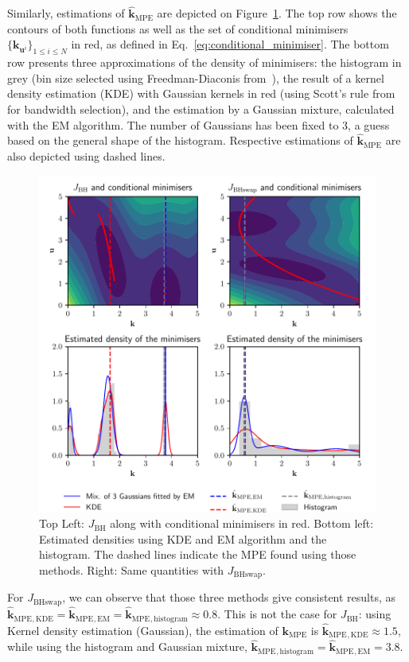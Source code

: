 \documentclass[preprint, 1p]{elsarticle}
\newcommand{\kmpe}{{\mathbf{k}}_{\mathrm{MPE}}}
\newcommand{\hatkmpe}{\hat{\mathbf{k}}_{\mathrm{MPE}}}
\newcommand{\JBH}{J_{\mathrm{BH}}}
\newcommand{\JBHS}{J_{\mathrm{BHswap}}}
\newlength{\singlecolumnsize}
\begin{document}
Similarly, estimations of $\hatkmpe$ are depicted on Figure~\ref{fig:contours}. The top row shows the contours of both functions as well as the set of conditional minimisers $\{\mathbf{k}_{\mathbf{u}^i}\}_{1\leq i \leq N}$ in red, as defined in Eq.~\eqref{eq:conditional_minimiser}.
The bottom row presents three approximations of the density of minimisers: the histogram in grey (bin size selected using Freedman-Diaconis from~\cite{freedman_histogram_1981}), the result of a kernel density estimation (KDE) with Gaussian kernels in red (using Scott's rule from~\cite{scott_optimal_1979} for bandwidth selection), and the estimation by a Gaussian mixture, calculated with the EM algorithm. The number of Gaussians has been fixed to 3, a guess based on the general shape of the histogram. Respective estimations of $\hatkmpe$ are also depicted using dashed lines. 
\begin{figure}[!h]
  \centering
  \includegraphics[width=\singlecolumnsize]{Figures/FIG02.pdf}
  \caption{Top Left:  $\JBH$ along with conditional minimisers in red. Bottom left: Estimated densities using KDE and EM algorithm and the histogram. The dashed lines indicate the MPE found using those methods. Right: Same quantities with $\JBHS$.}
\label{fig:contours}
\end{figure}

For $\JBHS$, we can observe that those three methods give consistent results, as $\hatkmpe {}_{,\mathrm{KDE}} =\hatkmpe {}_{,\mathrm{EM}}=\hatkmpe {}_{,\mathrm{histogram}}\approx 0.8$. This is not the case for $\JBH$: using Kernel density estimation (Gaussian), the estimation of $\kmpe$ is $\hatkmpe {}_{,\mathrm{KDE}} \approx 1.5$, while using the histogram and Gaussian mixture, $\hatkmpe {}_{,\mathrm{histogram}}=\hatkmpe {}_{,\mathrm{EM}}=3.8$.
\end{document}
